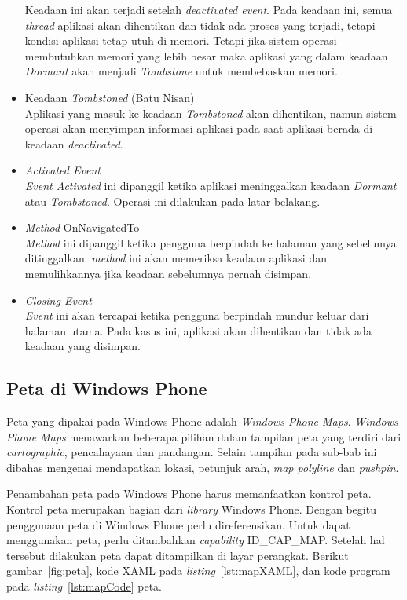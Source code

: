\begin{itemize}
	Keadaan ini akan terjadi setelah \textit{deactivated event}. Pada keadaan ini, semua \textit{thread} aplikasi akan dihentikan dan tidak ada proses yang terjadi, tetapi kondisi aplikasi tetap utuh di memori. Tetapi jika sistem operasi membutuhkan memori yang lebih besar maka aplikasi yang dalam keadaan \textit{Dormant} akan menjadi \textit{Tombstone} untuk membebaskan memori.
	\item Keadaan \textit{Tombstoned} (Batu Nisan) \\
	Aplikasi yang masuk ke keadaan \textit{Tombstoned} akan dihentikan, namun sistem operasi akan menyimpan informasi aplikasi pada saat aplikasi berada di keadaan \textit{deactivated}.
	\item \textit{Activated Event} \\
	\textit{Event Activated} ini dipanggil ketika aplikasi meninggalkan keadaan \textit{Dormant} atau \textit{Tombstoned}. Operasi ini dilakukan pada latar belakang. 
	\item \textit{Method} OnNavigatedTo\\
	\textit{Method} ini dipanggil ketika pengguna berpindah ke halaman yang sebelumya ditinggalkan. \textit{method} ini akan memeriksa keadaan aplikasi dan memulihkannya jika keadaan sebelumnya pernah disimpan. 
	\item \textit{Closing Event} \\
	\textit{Event} ini akan tercapai ketika pengguna berpindah mundur keluar dari halaman utama. Pada kasus ini, aplikasi akan dihentikan dan tidak ada keadaan yang disimpan. 
\end{itemize}

\subsection{Peta di Windows Phone \cite{MSDN}\cite{Manning}}
\label{subsec:Peta di Windows Phone}
\hspace{0.5cm} Peta yang dipakai pada Windows Phone adalah \textit{Windows Phone Maps}. \textit{Windows Phone Maps} menawarkan beberapa pilihan dalam tampilan peta yang terdiri dari \textit{cartographic}, pencahayaan dan pandangan. Selain tampilan pada sub-bab ini dibahas mengenai mendapatkan lokasi, petunjuk arah, \textit{map polyline} dan \textit{pushpin}\cite{MSDN}.

\hspace{0.5cm} Penambahan peta pada Windows Phone harus memanfaatkan kontrol peta. Kontrol peta merupakan bagian dari \textit{library} Windows Phone. Dengan begitu penggunaan peta di Windows Phone perlu direferensikan. Untuk dapat menggunakan peta, perlu ditambahkan \textit{capability} ID\_CAP\_MAP. Setelah hal tersebut dilakukan peta dapat ditampilkan di layar perangkat. Berikut gambar~\ref{fig:peta}, kode XAML pada \textit{listing}~\ref{lst:mapXAML}, dan kode program pada \textit{listing}~\ref{lst:mapCode} peta.

